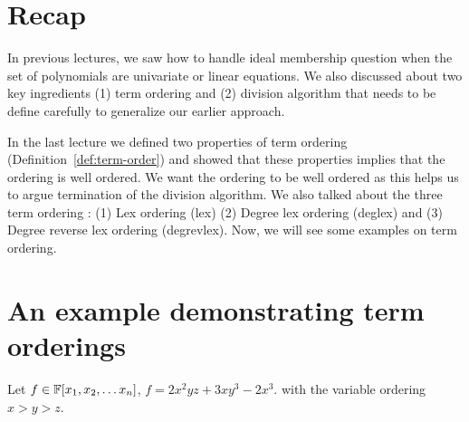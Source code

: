 
\section{Recap}
In previous lectures, we saw how to handle ideal membership question when the
set of polynomials are univariate or linear equations.  We also discussed
about two key ingredients (1) term ordering and (2) division algorithm that 
needs to be define carefully to generalize our earlier approach.

In the last lecture we defined two properties of term ordering
(Definition~\ref{def:term-order}) and showed that these properties 
implies that the ordering is well ordered. We want the ordering to be well
ordered as this helps us to argue termination of the division algorithm.  We 
also talked about the three term ordering : (1) Lex ordering (lex) (2) 
Degree lex ordering (deglex) and (3) Degree reverse lex ordering (degrevlex).
Now, we will see some examples on term ordering.

\section{An example demonstrating term orderings}

Let $f \in {\mathbb{F}[x_1,x_2, \ldots x_n]}$, $f = 2x^2yz + 3xy^3 - 2x^3$. with the variable ordering
$x>y>z$.

